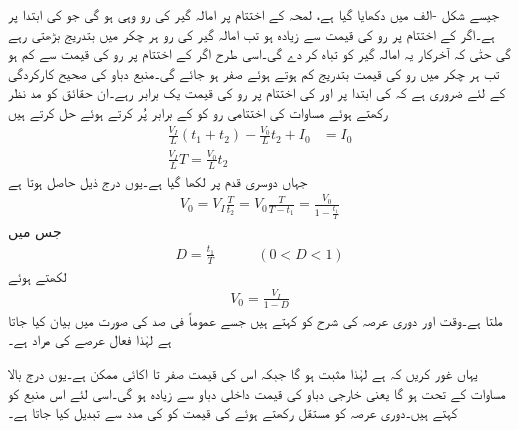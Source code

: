 جیسے شکل -الف میں دکھایا گیا ہے، لمحہ  کے اختتام پر امالہ گیر کی رو وہی ہو گی جو  کی ابتدا پر ہے۔اگر  کے اختتام پر رو کی قیمت  سے زیادہ ہو تب امالہ گیر کی رو ہر چکر میں بتدریج بڑھتی رہے گی حتٰی کہ آخرکار یہ امالہ گیر کو تباہ کر دے گی۔اسی طرح اگر  کے اختتام پر رو کی قیمت  سے کم ہو تب ہر چکر میں رو کی قیمت بتدریج کم ہوتے ہوئے صفر ہو جائے گی۔منبع دباو کی صحیح کارکردگی کے لئے ضروری ہے کہ  کی ابتدا پر اور  کی اختتام پر رو کی قیمت یک برابر رہے۔ان حقائق کو مد نظر رکھتے ہوئے مساوات  کی اختتامی رو کو  کے برابر پُر کرتے ہوئے حل کرتے ہیں
\begin{align*}
\frac{V_I}{L}(t_1+t_2)-\frac{V_0}{L}t_2+I_0 &=I_0\\
\frac{V_I}{L}T=\frac{V_0}{L}t_2
\end{align*}
جہاں دوسری قدم پر  لکھا گیا ہے۔یوں درج ذیل حاصل ہوتا ہے
\begin{align*}
V_0=V_I \frac{T}{t_2}=V_0 \frac{T}{T-t_1}=\frac{V_0}{1-\frac{t_1}{T}}
\end{align*}
جس میں
\begin{align}
D=\frac{t_1}{T}\quad \quad \quad (0< D < 1)
\end{align}
لکھتے ہوئے
\begin{align}
V_0=\frac{V_I}{1-D}
\end{align}
ملتا ہے۔وقت  اور دوری عرصہ  کی شرح  کو  کہتے ہیں جسے عموماً فی صد کی صورت میں بیان کیا جاتا ہے لہٰذا  فعال عرصے کی مراد  ہے۔

یہاں غور کریں کہ  ہے لہٰذا   مثبت ہو گا جبکہ اس کی قیمت صفر تا اکائی  ممکن ہے۔یوں درج بالا مساوات کے تحت  ہو گا یعنی خارجی دباو کی قیمت داخلی دباو سے زیادہ ہو گی۔اسی لئے اس منبع کو  کہتے ہیں۔دوری عرصہ  کو مستقل رکھتے ہوئے  کی قیمت کو  کی مدد سے تبدیل کیا جاتا ہے۔

